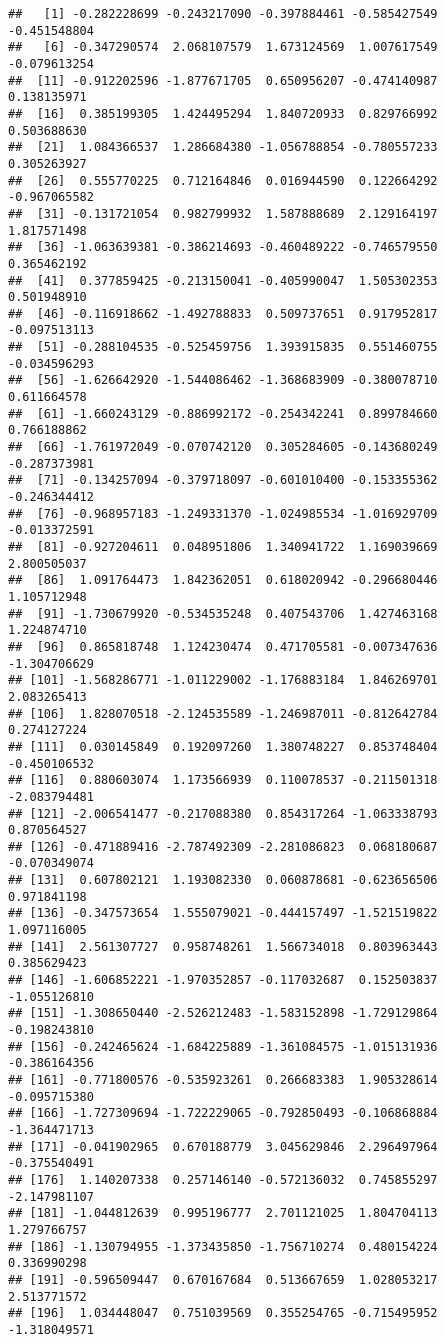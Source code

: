 \documentclass[
]{article}
\begin{document}
\begin{verbatim}
##   [1] -0.282228699 -0.243217090 -0.397884461 -0.585427549 -0.451548804
##   [6] -0.347290574  2.068107579  1.673124569  1.007617549 -0.079613254
##  [11] -0.912202596 -1.877671705  0.650956207 -0.474140987  0.138135971
##  [16]  0.385199305  1.424495294  1.840720933  0.829766992  0.503688630
##  [21]  1.084366537  1.286684380 -1.056788854 -0.780557233  0.305263927
##  [26]  0.555770225  0.712164846  0.016944590  0.122664292 -0.967065582
##  [31] -0.131721054  0.982799932  1.587888689  2.129164197  1.817571498
##  [36] -1.063639381 -0.386214693 -0.460489222 -0.746579550  0.365462192
##  [41]  0.377859425 -0.213150041 -0.405990047  1.505302353  0.501948910
##  [46] -0.116918662 -1.492788833  0.509737651  0.917952817 -0.097513113
##  [51] -0.288104535 -0.525459756  1.393915835  0.551460755 -0.034596293
##  [56] -1.626642920 -1.544086462 -1.368683909 -0.380078710  0.611664578
##  [61] -1.660243129 -0.886992172 -0.254342241  0.899784660  0.766188862
##  [66] -1.761972049 -0.070742120  0.305284605 -0.143680249 -0.287373981
##  [71] -0.134257094 -0.379718097 -0.601010400 -0.153355362 -0.246344412
##  [76] -0.968957183 -1.249331370 -1.024985534 -1.016929709 -0.013372591
##  [81] -0.927204611  0.048951806  1.340941722  1.169039669  2.800505037
##  [86]  1.091764473  1.842362051  0.618020942 -0.296680446  1.105712948
##  [91] -1.730679920 -0.534535248  0.407543706  1.427463168  1.224874710
##  [96]  0.865818748  1.124230474  0.471705581 -0.007347636 -1.304706629
## [101] -1.568286771 -1.011229002 -1.176883184  1.846269701  2.083265413
## [106]  1.828070518 -2.124535589 -1.246987011 -0.812642784  0.274127224
## [111]  0.030145849  0.192097260  1.380748227  0.853748404 -0.450106532
## [116]  0.880603074  1.173566939  0.110078537 -0.211501318 -2.083794481
## [121] -2.006541477 -0.217088380  0.854317264 -1.063338793  0.870564527
## [126] -0.471889416 -2.787492309 -2.281086823  0.068180687 -0.070349074
## [131]  0.607802121  1.193082330  0.060878681 -0.623656506  0.971841198
## [136] -0.347573654  1.555079021 -0.444157497 -1.521519822  1.097116005
## [141]  2.561307727  0.958748261  1.566734018  0.803963443  0.385629423
## [146] -1.606852221 -1.970352857 -0.117032687  0.152503837 -1.055126810
## [151] -1.308650440 -2.526212483 -1.583152898 -1.729129864 -0.198243810
## [156] -0.242465624 -1.684225889 -1.361084575 -1.015131936 -0.386164356
## [161] -0.771800576 -0.535923261  0.266683383  1.905328614 -0.095715380
## [166] -1.727309694 -1.722229065 -0.792850493 -0.106868884 -1.364471713
## [171] -0.041902965  0.670188779  3.045629846  2.296497964 -0.375540491
## [176]  1.140207338  0.257146140 -0.572136032  0.745855297 -2.147981107
## [181] -1.044812639  0.995196777  2.701121025  1.804704113  1.279766757
## [186] -1.130794955 -1.373435850 -1.756710274  0.480154224  0.336990298
## [191] -0.596509447  0.670167684  0.513667659  1.028053217  2.513771572
## [196]  1.034448047  0.751039569  0.355254765 -0.715495952 -1.318049571
\end{verbatim}
\end{document}
